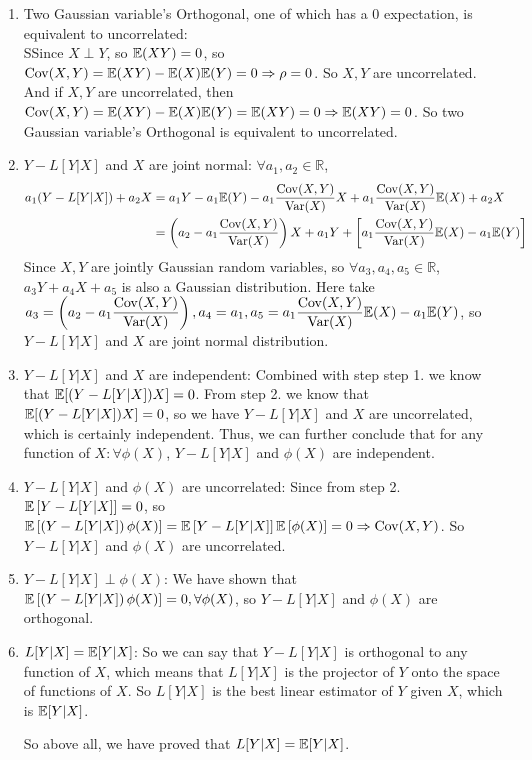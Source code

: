 \begin{homeworkProblem}
\begin{enumerate}
\item Two Gaussian variable's Orthogonal, one of which has a $0$ expectation, is equivalent to uncorrelated: \\
SSince $X\perp Y$, so $\mathbb{E}(XY)=0$, so $\mathrm{Cov}(X,Y)=\mathbb{E}(XY)-\mathbb{E}(X)\mathbb{E}(Y)=0\Rightarrow \rho=0$. So $X, Y$ are uncorrelated. \\
And if $X,Y$ are uncorrelated, then $\mathrm{Cov}(X,Y)=\mathbb{E}(XY)-\mathbb{E}(X)\mathbb{E}(Y)=\mathbb{E}(XY)=0\Rightarrow \mathbb{E}(XY)=0$.
So two Gaussian variable's Orthogonal is equivalent to uncorrelated.

\item $Y-L[Y|X]$ and $X$ are joint normal: $\forall a_1, a_2\in\mathbb{R}$,
\begin{align*}
a_1(Y - L[Y|X]) + a_2X &= a_1Y - a_1\mathbb{E}(Y) - a_1\dfrac{\mathrm{Cov}(X,Y)}{\mathrm{Var}(X)}X + a_1\dfrac{\mathrm{Cov}(X,Y)}{\mathrm{Var}(X)}\mathbb{E}(X) + a_2X \\
&= \left(a_2 - a_1 \dfrac{\mathrm{Cov}(X,Y)}{\mathrm{Var}(X)}\right)X + a_1Y + \left[a_1\dfrac{\mathrm{Cov}(X,Y)}{\mathrm{Var}(X)}\mathbb{E}(X) - a_1\mathbb{E}(Y)\right]
\end{align*}
Since $X, Y$ are jointly Gaussian random variables, so $\forall a_3, a_4, a_5\in\mathbb{R}$, $a_3Y+a_4X+a_5$ is also a Gaussian distribution. Here take $a_3=\left(a_2 - a_1 \dfrac{\mathrm{Cov}(X,Y)}{\mathrm{Var}(X)}\right), a_4=a_1, a_5=a_1\dfrac{\mathrm{Cov}(X,Y)}{\mathrm{Var}(X)}\mathbb{E}(X) - a_1\mathbb{E}(Y)$, so $Y-L[Y|X]$ and $X$ are joint normal distribution.

\item $Y-L[Y|X]$ and $X$ are independent:
Combined with step step 1. we know that $\mathbb{E}[(Y - L[Y|X])X] = 0$. From step 2. we know that $\mathbb{E}[(Y - L[Y|X])X] = 0$, so we have $Y-L[Y|X]$ and $X$ are uncorrelated, which is certainly independent. Thus, we can further conclude that for any function of $X: \forall\phi(X)$, $Y-L[Y|X]$ and $\phi(X)$ are independent.

\item $Y-L[Y|X]$ and $\phi(X)$ are uncorrelated:
Since from step 2. $\mathbb{E}\left[Y-L[Y|X]\right]=0$, so $\mathbb{E}\left[\left(Y-L[Y|X]\right)\phi(X)\right]=\mathbb{E}\left[Y-L[Y|X]\right]\mathbb{E}\left[\phi(X)\right]=0\Rightarrow \mathrm{Cov}(X,Y)$. So $Y-L[Y|X]$ and $\phi(X)$ are uncorrelated.

\item $Y-L[Y|X]\perp \phi(X)$: We have shown that $\mathbb{E}\left[\left(Y-L[Y|X]\right)\phi(X)\right]=0, \forall\phi(X)$, so $Y-L[Y|X]$ and $\phi(X)$ are orthogonal.

\item $L[Y|X]=\mathbb{E}[Y|X]$: So we can say that $Y-L[Y|X]$ is orthogonal to any function of $X$, which means that $L[Y|X]$ is the projector of $Y$ onto the space of functions of $X$. So $L[Y|X]$ is the best linear estimator of $Y$ given $X$, which is $\mathbb{E}[Y|X]$.

So above all, we have proved that $L[Y|X]=\mathbb{E}[Y|X]$.

\end{enumerate}

\end{homeworkProblem}

\newpage